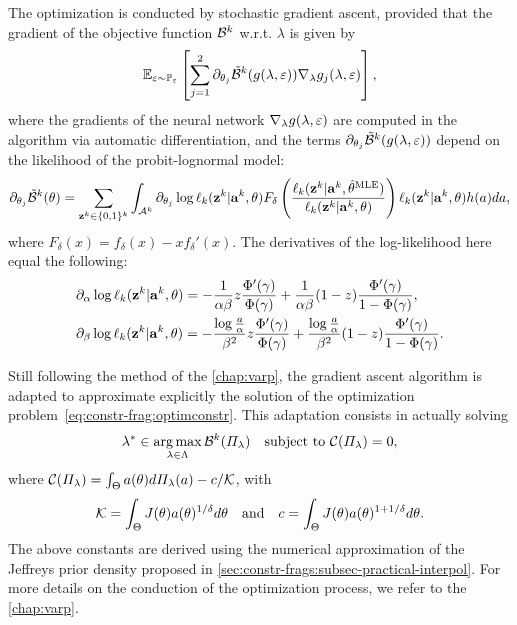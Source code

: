 The optimization is conducted by stochastic gradient ascent, provided that the gradient of the objective function $\mathcal{B}^k$ w.r.t. $\lambda$ is given by
    \begin{equation}
        \mathbb{E}_{\varepsilon\sim\mathbb{P}_\varepsilon}\left[\sum_{j=1}^{2}\partial_{\theta_j}\tilde{\mathcal{B}}^k(g(\lambda,\varepsilon))\nabla_\lambda g_j(\lambda,\varepsilon)
        \right],
    \end{equation}
where the gradients of the neural network $\nabla_\lambda g(\lambda,\varepsilon)$ are computed in the algorithm via automatic differentiation, and the terms $\partial_{\theta_j}\tilde{\mathcal{B}}^k(g(\lambda,\varepsilon))$  depend on the likelihood of %
the probit-lognormal model:
    \begin{equation}
        \partial_{\theta_j}\tilde{\mathcal{B}}^k(\theta) = \sum_{\mathbf{z}^k\in\{0,1\}^k}\int_{\mathcal{A}^k} \partial_{\theta_j}\log\ell_k(\mathbf{z}^k|\mathbf{a}^k,\theta) F_\delta\left(\frac{\ell_k(\mathbf{z}^k|\mathbf{a}^k,\hat\theta^{\text{MLE}})}{\ell_k(\mathbf{z}^k|\mathbf{a}^k,\theta)}\right)\ell_k(\mathbf{z}^k|\mathbf{a}^k,\theta)h(a)da,
    \end{equation}
where $F_\delta(x) = f_\delta(x)-xf_\delta'(x)$.
The derivatives of the log-likelihood here equal the following:
    \begin{equation}
        \begin{aligned}
            &\partial_\alpha\log\ell_k(\mathbf{z}^k|\mathbf{a}^k,\theta) =  -\frac{1}{\alpha\beta}z\frac{\Phi'(\gamma)}{\Phi(\gamma)} + \frac{1}{\alpha\beta}(1-z)\frac{\Phi'(\gamma)}{1-\Phi(\gamma)} , \\
            &\partial_\beta\log\ell_k(\mathbf{z}^k|\mathbf{a}^k,\theta) = -\frac{\log\frac{a}{\alpha}}{\beta^2}z\frac{\Phi'(\gamma)}{\Phi(\gamma)}+ \frac{\log\frac{a}{\alpha}}{\beta^2}(1-z)\frac{\Phi'(\gamma)}{1-\Phi(\gamma)} .
        \end{aligned}
    \end{equation}




Still following the method of the \cref{chap:varp},
the gradient ascent algorithm is adapted to approximate explicitly the solution of the optimization problem~\eqref{eq:constr-frag:optimconstr}.
This adaptation consists in actually solving
    \begin{equation}
        \lambda^\ast\in\operatorname*{arg\,max}_{\lambda\in\Lambda}\mathcal{B}^k(\varPi_\lambda)\quad\text{subject to\ } \mathcal{C}(\varPi_\lambda)=0,
    \end{equation}
where $\mathcal{C}(\varPi_\lambda)=\int_\Theta a(\theta)d\varPi_\lambda(a) - c/\mathcal{K}$, with
    \begin{equation}
        \mathcal{K}=\int_\Theta J(\theta)a(\theta)^{1/\delta}d\theta \quad\text{and}\quad
        c = \int_\Theta J(\theta)a(\theta)^{1+1/\delta}d\theta.
    \end{equation}
The above constants are derived using the numerical approximation of the Jeffreys prior density proposed in \cref{sec:constr-frags:subsec-practical-interpol}.
For more details on the conduction of the optimization process, we refer to the \cref{chap:varp}.



